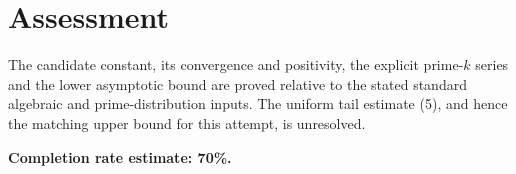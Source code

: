 \documentclass[11pt]{article}
\begin{document}
\section*{Assessment}
The candidate constant, its convergence and positivity, the explicit prime-$k$ series and the lower asymptotic bound are proved relative to the stated standard algebraic and prime-distribution inputs. The uniform tail estimate (5), and hence the matching upper bound for this attempt, is unresolved.

\textbf{Completion rate estimate: 70\%.}
\end{document}

